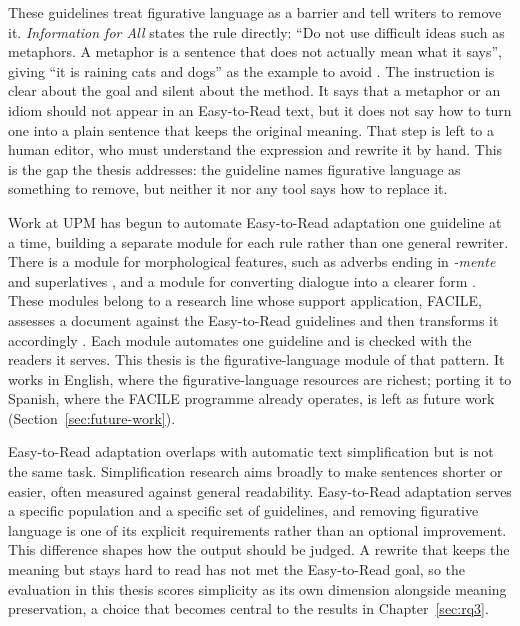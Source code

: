 These guidelines treat figurative language as a barrier and tell writers to
remove it. \textit{Information for All} states the rule directly: ``Do not use
difficult ideas such as metaphors. A metaphor is a sentence that does not
actually mean what it says'', giving ``it is raining cats and dogs'' as the
example to avoid \cite{InclusionEurope2009}. The instruction is clear about the
goal and silent about the method. It says that a metaphor or an idiom should not
appear in an Easy-to-Read text, but it does not say how to turn one into a plain
sentence that keeps the original meaning. That step is left to a human editor,
who must understand the expression and rewrite it by hand. This is the gap the
thesis addresses: the guideline names figurative language as something to
remove, but neither it nor any tool says how to replace it.

Work at UPM has begun to automate Easy-to-Read adaptation one guideline at a
time, building a separate module for each rule rather than one general
rewriter. There is a module for morphological features, such as adverbs ending
in \textit{-mente} and superlatives \cite{Surez-Figueroa2023}, and a module for
converting dialogue into a clearer form \cite{Diab2024}. These modules belong to
a research line whose support application, FACILE, assesses a document against
the Easy-to-Read guidelines and then transforms it accordingly
\cite{Surez-Figueroa2024}. Each module automates one guideline and is checked
with the readers it serves. This thesis is the figurative-language module of
that pattern. It works in English, where the figurative-language resources are
richest; porting it to Spanish, where the FACILE programme already operates, is
left as future work (Section~\ref{sec:future-work}).

Easy-to-Read adaptation overlaps with automatic text simplification but is not
the same task. Simplification research aims broadly to make sentences shorter
or easier, often measured against general readability. Easy-to-Read adaptation
serves a specific population and a specific set of guidelines, and removing
figurative language is one of its explicit requirements rather than an optional
improvement. This difference shapes how the output should be judged. A rewrite
that keeps the meaning but stays hard to read has not met the Easy-to-Read goal,
so the evaluation in this thesis scores simplicity as its own dimension
alongside meaning preservation, a choice that becomes central to the results in
Chapter~\ref{sec:rq3}.


